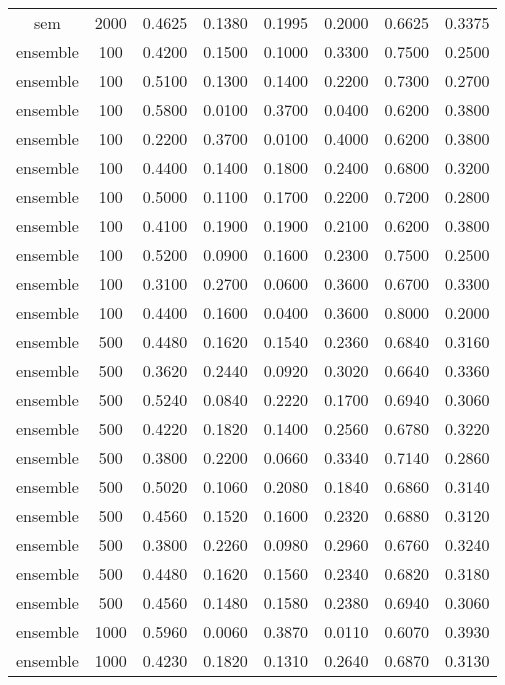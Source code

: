 \begin{scriptsize}
\begin{longtable}{cccccccc}
		sem      & 2000 & 0.4625 & 0.1380 & 0.1995 & 0.2000 & 0.6625 & 0.3375 \\
		ensemble & 100  & 0.4200 & 0.1500 & 0.1000 & 0.3300 & 0.7500 & 0.2500 \\
		ensemble & 100  & 0.5100 & 0.1300 & 0.1400 & 0.2200 & 0.7300 & 0.2700 \\
		ensemble & 100  & 0.5800 & 0.0100 & 0.3700 & 0.0400 & 0.6200 & 0.3800 \\
		ensemble & 100  & 0.2200 & 0.3700 & 0.0100 & 0.4000 & 0.6200 & 0.3800 \\
		ensemble & 100  & 0.4400 & 0.1400 & 0.1800 & 0.2400 & 0.6800 & 0.3200 \\
		ensemble & 100  & 0.5000 & 0.1100 & 0.1700 & 0.2200 & 0.7200 & 0.2800 \\
		ensemble & 100  & 0.4100 & 0.1900 & 0.1900 & 0.2100 & 0.6200 & 0.3800 \\
		ensemble & 100  & 0.5200 & 0.0900 & 0.1600 & 0.2300 & 0.7500 & 0.2500 \\
		ensemble & 100  & 0.3100 & 0.2700 & 0.0600 & 0.3600 & 0.6700 & 0.3300 \\
		ensemble & 100  & 0.4400 & 0.1600 & 0.0400 & 0.3600 & 0.8000 & 0.2000 \\
		ensemble & 500  & 0.4480 & 0.1620 & 0.1540 & 0.2360 & 0.6840 & 0.3160 \\
		ensemble & 500  & 0.3620 & 0.2440 & 0.0920 & 0.3020 & 0.6640 & 0.3360 \\
		ensemble & 500  & 0.5240 & 0.0840 & 0.2220 & 0.1700 & 0.6940 & 0.3060 \\
		ensemble & 500  & 0.4220 & 0.1820 & 0.1400 & 0.2560 & 0.6780 & 0.3220 \\
		ensemble & 500  & 0.3800 & 0.2200 & 0.0660 & 0.3340 & 0.7140 & 0.2860 \\
		ensemble & 500  & 0.5020 & 0.1060 & 0.2080 & 0.1840 & 0.6860 & 0.3140 \\
		ensemble & 500  & 0.4560 & 0.1520 & 0.1600 & 0.2320 & 0.6880 & 0.3120 \\
		ensemble & 500  & 0.3800 & 0.2260 & 0.0980 & 0.2960 & 0.6760 & 0.3240 \\
		ensemble & 500  & 0.4480 & 0.1620 & 0.1560 & 0.2340 & 0.6820 & 0.3180 \\
		ensemble & 500  & 0.4560 & 0.1480 & 0.1580 & 0.2380 & 0.6940 & 0.3060 \\
		ensemble & 1000 & 0.5960 & 0.0060 & 0.3870 & 0.0110 & 0.6070 & 0.3930 \\
		ensemble & 1000 & 0.4230 & 0.1820 & 0.1310 & 0.2640 & 0.6870 & 0.3130 \\

\end{longtable}
\end{scriptsize}
